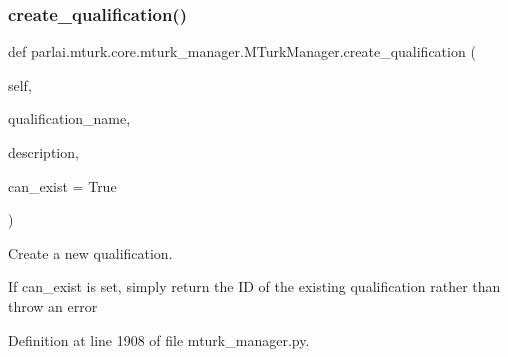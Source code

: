 \mbox{\label{classparlai_1_1mturk_1_1core_1_1mturk__manager_1_1MTurkManager_a663af5f8cfa1c984439c2344d528f223}} 
\subsubsection{\texorpdfstring{create\+\_\+qualification()}{create\_qualification()}}
{\footnotesize\ttfamily def parlai.\+mturk.\+core.\+mturk\+\_\+manager.\+M\+Turk\+Manager.\+create\+\_\+qualification (\begin{DoxyParamCaption}\item[{}]{self,  }\item[{}]{qualification\+\_\+name,  }\item[{}]{description,  }\item[{}]{can\+\_\+exist = {\ttfamily True} }\end{DoxyParamCaption})}

\begin{DoxyVerb}Create a new qualification.

If can_exist is set, simply return the ID of the existing qualification rather
than throw an error
\end{DoxyVerb}
 

Definition at line 1908 of file mturk\+\_\+manager.\+py.


